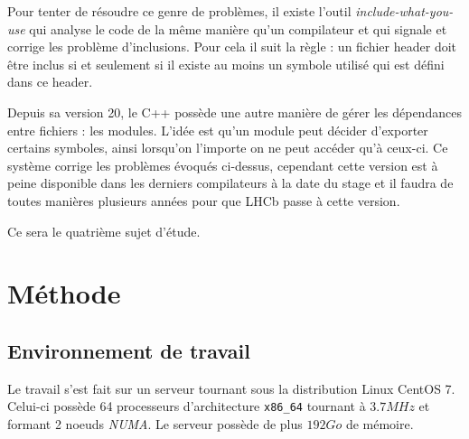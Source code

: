 \documentclass[a4paper,11pt]{report}
\begin{document}

Pour tenter de résoudre ce genre de problèmes, il existe l'outil \emph{include-what-you-use} qui analyse le code de la même manière qu'un compilateur et qui signale et corrige les problème d'inclusions.
Pour cela il suit la règle : un fichier header doit être inclus si et seulement si il existe au moins un symbole utilisé qui est défini dans ce header.

Depuis sa version 20, le C++ possède une autre manière de gérer les dépendances entre fichiers : les modules.
L'idée est qu'un module peut décider d'exporter certains symboles, ainsi lorsqu'on l'importe on ne peut accéder qu'à ceux-ci.
Ce système corrige les problèmes évoqués ci-dessus,
cependant cette version est à peine disponible dans les derniers compilateurs à la date du stage et il faudra de toutes manières plusieurs années pour que LHCb passe à cette version.

\bigskip
Ce sera le quatrième sujet d'étude.


\chapter{Méthode}
\section{Environnement de travail}
Le travail s'est fait sur un serveur tournant sous la distribution Linux CentOS 7.
Celui-ci possède 64 processeurs d'architecture \verb'x86_64' tournant à $3.7 MHz$ et formant 2 noeuds \emph{NUMA}.
Le serveur possède de plus $192 Go$ de mémoire.
\end{document}
